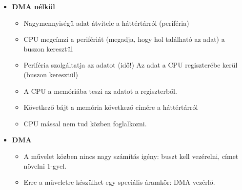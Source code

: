 \documentclass[11pt,a4paper]{article}
\begin{document}
            \begin{tcolorbox}[colback=blue!5!white,colframe=blue!50!black,title= 14. Ismertesse a periféria csatolási módszereket{,} módszerenként kitérve az adott módszer előnyére{,} és hátrányára! Part 2.]
                \begin{itemize}
                    \item \textbf{DMA nélkül}
                    \begin{itemize}
                        \item  Nagymennyiségű adat átvitele a háttértárról (periféria)
                        \item CPU megcímzi a perifériát (megadja, hogy hol található az adat) a buszon keresztül
                        \item Periféria szolgáltatja az adatot (idő!) Az adat a CPU regiszterébe kerül (buszon keresztül)
                        \item A CPU a memóriába teszi az adatot a regiszterből.
                        \item Következő bájt a memória következő címére a háttértárról
                        \item CPU mással nem tud közben foglalkozni.
                    \end{itemize}
                    \begin{center}
                    \end{center}
                    \item \textbf{DMA}
                    \begin{itemize}
                        \item A művelet közben nincs nagy számítás igény: buszt kell vezérelni, címet növelni 1-gyel.
                        \item Erre a műveletre készülhet egy speciális áramkör: DMA vezérlő.
                    \end{itemize}
                    \begin{enumerate}

\end{enumerate}
\end{itemize}
\end{tcolorbox}
\end{document}
